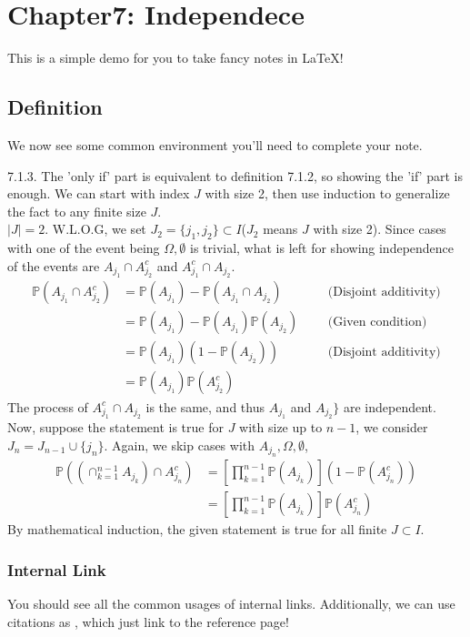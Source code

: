 \section*{Chapter7: Independece}

This is a simple demo for you to take fancy notes in \LaTeX!

\subsection{Definition}
We now see some common environment you'll need to complete your note.

\begin{answer}
	7.1.3. The 'only if' part is equivalent to definition 7.1.2, so showing the 'if' part is enough. We can start with index $J$ with size 2, then use induction to generalize the fact to any finite size $J$.
	\\
	$|J|= 2$. W.L.O.G, we set $J_2 = \{j_1,j_2\} \subset I$($J_2$ means $J$ with size 2). Since cases with one of the event being $\Omega, \emptyset$ is trivial, what is left for showing independence of the events are $A_{j_1}\cap A_{j_2}^c$ and $ A_{j_1}^c \cap A_{j_2}$. 
	\begin{equation*}
		\begin{aligned}
			\mathbb{P}(A_{j_1} \cap A_{j_2}^{c}) &=  \mathbb{P}(A_{j_1}) - \mathbb{P}(A_{j_1} \cap A_{j_2})  \qquad && \text{(Disjoint additivity)}
			\\ &= \mathbb{P}(A_{j_1}) - \mathbb{P}(A_{j_1})\mathbb{P}(A_{j_2}) && \text{(Given condition)}
			\\ &= \mathbb{P}(A_{j_1})(1 - \mathbb{P}(A_{j_2})) && \text{(Disjoint additivity)}
			\\ &= \mathbb{P}(A_{j_1})\mathbb{P}(A_{j_2}^c) 
		\end{aligned}
	\end{equation*}
	The process of $A_{j_1}^c \cap A_{j_2}$ is the same, and thus $A_{j_1}$ and $A_{j_2}\}$ are independent.  
	Now, suppose the statement is true for $J$ with size up to $n-1$, we consider $J_n = J_{n-1} \cup \{j_n\}$. Again, we skip cases with $A_{j_n},\Omega, \emptyset$,
	\begin{equation*}
		\begin{aligned}
			\mathbb{P}((\cap_{k=1}^{n-1} A_{j_k}) \cap A_{j_n}^c)  &= [\prod_{k=1}^{n-1}\mathbb{P}(A_{j_k})](1 - \mathbb{P}(A_{j_n}^c))
			\\ &=  [\prod_{k=1}^{n-1}\mathbb{P}(A_{j_k})] \mathbb{P}(A_{j_n}^c) 
		\end{aligned}
	\end{equation*}
	By mathematical induction, the given statement is true for all finite $J \subset I$. 
\end{answer}


\subsubsection{Internal Link}
You should see all the common usages of internal links. Additionally, we can use citations as \cite{newton1726philosophiae}, which just link
to the reference page!
